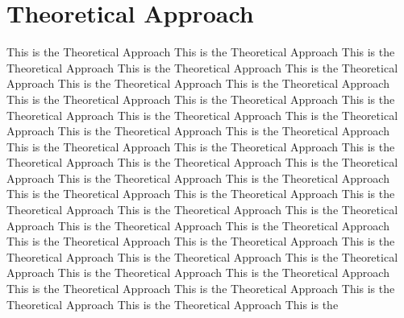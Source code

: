 \documentclass[twocolumn,a4paper,10pt]{article}
\begin{document}
\section{Theoretical Approach}
This is the Theoretical Approach This is the Theoretical Approach This is the Theoretical Approach This is the Theoretical Approach This is the Theoretical Approach This is the Theoretical Approach This is the Theoretical Approach This is the Theoretical Approach This is the Theoretical Approach This is the Theoretical Approach This is the Theoretical Approach This is the Theoretical Approach This is the Theoretical Approach This is the Theoretical Approach This is the Theoretical Approach This is the Theoretical Approach This is the Theoretical Approach This is the Theoretical Approach This is the Theoretical Approach This is the Theoretical Approach This is the Theoretical Approach This is the Theoretical Approach This is the Theoretical Approach This is the Theoretical Approach This is the Theoretical Approach This is the Theoretical Approach This is the Theoretical Approach This is the Theoretical Approach This is the Theoretical Approach This is the Theoretical Approach This is the Theoretical Approach This is the Theoretical Approach This is the Theoretical Approach This is the Theoretical Approach This is the Theoretical Approach This is the Theoretical Approach This is the Theoretical Approach This is the Theoretical Approach This is the Theoretical Approach This is the 
\end{document}
